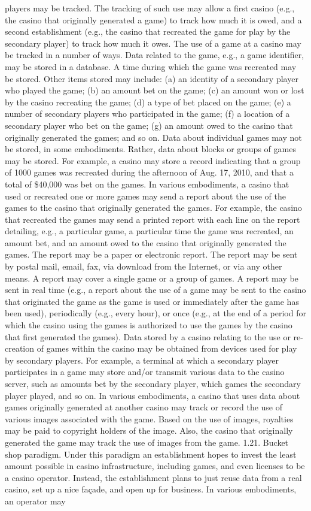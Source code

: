 \documentclass[11pt,a4paper]{article}
\begin{document}
players may be tracked. The tracking of such use may allow a first casino (e.g., the casino that originally generated a game) to track how much it is owed, and a second establishment (e.g., the casino that recreated the game for play by the secondary player) to track how much it owes. The use of a game at a casino may be tracked in a number of ways. Data related to the game, e.g., a game identifier, may be stored in a database. A time during which the game was recreated may be stored. Other items stored may include: (a) an identity of a secondary player who played the game; (b) an amount bet on the game; (c) an amount won or lost by the casino recreating the game; (d) a type of bet placed on the game; (e) a number of secondary players who participated in the game; (f) a location of a secondary player who bet on the game; (g) an amount owed to the casino that originally generated the games; and so on. Data about individual games may not be stored, in some embodiments. Rather, data about blocks or groups of games may be stored. For example, a casino may store a record indicating that a group of 1000 games was recreated during the afternoon of Aug. 17, 2010, and that a total of \$40,000 was bet on the games. In various embodiments, a casino that used or recreated one or more games may send a report about the use of the games to the casino that originally generated the games. For example, the casino that recreated the games may send a printed report with each line on the report detailing, e.g., a particular game, a particular time the game was recreated, an amount bet, and an amount owed to the casino that originally generated the games. The report may be a paper or electronic report. The report may be sent by postal mail, email, fax, via download from the Internet, or via any other means. A report may cover a single game or a group of games. A report may be sent in real time (e.g., a report about the use of a game may be sent to the casino that originated the game as the game is used or immediately after the game has been used), periodically (e.g., every hour), or once (e.g., at the end of a period for which the casino using the games is authorized to use the games by the casino that first generated the games). Data stored by a casino relating to the use or re-creation of games within the casino may be obtained from devices used for play by secondary players. For example, a terminal at which a secondary player participates in a game may store and/or transmit various data to the casino server, such as amounts bet by the secondary player, which games the secondary player played, and so on. In various embodiments, a casino that uses data about games originally generated at another casino may track or record the use of various images associated with the game. Based on the use of images, royalties may be paid to copyright holders of the image. Also, the casino that originally generated the game may track the use of images from the game. 1.21. Bucket shop paradigm. Under this paradigm an establishment hopes to invest the least amount possible in casino infrastructure, including games, and even licenses to be a casino operator. Instead, the establishment plans to just reuse data from a real casino, set up a nice façade, and open up for business. In various embodiments, an operator may 
\end{document}
